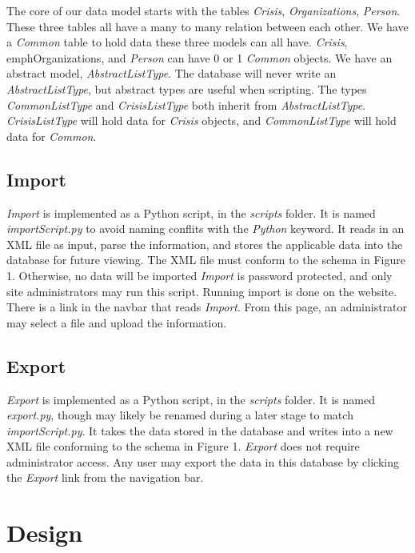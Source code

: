 \documentclass[12pt]{report}
\begin{document}
The core of our data model starts with the tables \emph{Crisis}, \emph{Organizations}, \emph{Person}.
These three tables all have a many to many relation between each other.
We have a \emph{Common} table to hold data these three models can all have.
\emph{Crisis}, emph{Organizations}, and \emph{Person} can have 0 or 1 \emph{Common} objects.
We have an abstract model, \emph{AbstractListType}.
The database will never write an \emph{AbstractListType}, but abstract types are useful when scripting.
The types \emph{CommonListType} and \emph{CrisisListType} both inherit from \emph{AbstractListType}.
\emph{CrisisListType} will hold data for \emph{Crisis} objects, and \emph{CommonListType} will hold data for \emph{Common}.


\subsection*{Import}
\hfill


\emph{Import} is implemented as a Python script, in the \emph{scripts} folder.
It is named \emph{importScript.py} to avoid naming conflits with the \emph{Python} keyword.
It reads in an XML file as input, parse the information, and stores the applicable data into the database for future viewing.
The XML file must conform to the schema in Figure 1.
Otherwise, no data will be imported
\emph{Import} is password protected, and only site administrators may run this script.
Running import is done on the website.
There is a link in the navbar that reads \emph{Import}.
From this page, an administrator may select a file and upload the information.


\subsection*{Export}
\hfill


\emph{Export} is implemented as a Python script, in the \emph{scripts} folder.
It is named \emph{export.py}, though may likely be renamed during a later stage to match \emph{importScript.py}.
It takes the data stored in the database and writes into a new XML file conforming to the schema in Figure 1.
\emph{Export} does not require administrator access.
Any user may export the data in this database by clicking the \emph{Export} link from the navigation bar.


\newpage
\section*{Design}
\end{document}

